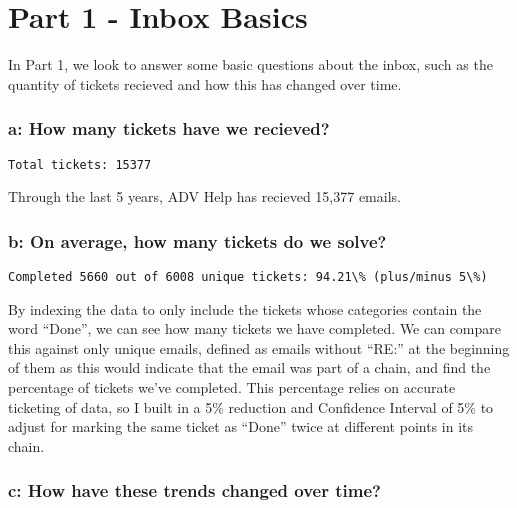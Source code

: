 \documentclass[11pt]{article}
\begin{document}
    \hypertarget{part-1---inbox-basics}{%
\section{Part 1 - Inbox Basics}\label{part-1---inbox-basics}}

In Part 1, we look to answer some basic questions about the inbox, such
as the quantity of tickets recieved and how this has changed over time.

\hypertarget{a-how-many-tickets-have-we-recieved}{%
\subsubsection{a: How many tickets have we
recieved?}\label{a-how-many-tickets-have-we-recieved}}


    \begin{Verbatim}[commandchars=\\\{\}]
Total tickets: 15377
    \end{Verbatim}

    Through the last 5 years, ADV Help has recieved 15,377 emails.

    \hypertarget{b-on-average-how-many-tickets-do-we-solve}{%
\subsubsection{b: On average, how many tickets do we
solve?}\label{b-on-average-how-many-tickets-do-we-solve}}

    \begin{Verbatim}[commandchars=\\\{\}]
Completed 5660 out of 6008 unique tickets: 94.21\% (plus/minus 5\%)
    \end{Verbatim}

    By indexing the data to only include the tickets whose categories
contain the word ``Done'', we can see how many tickets we have
completed. We can compare this against only unique emails, defined as
emails without ``RE:'' at the beginning of them as this would indicate
that the email was part of a chain, and find the percentage of tickets
we've completed. This percentage relies on accurate ticketing of data,
so I built in a 5\% reduction and Confidence Interval of 5\% to adjust
for marking the same ticket as ``Done'' twice at different points in its
chain.

    \hypertarget{c-how-have-these-trends-changed-over-time}{%
\subsubsection{c: How have these trends changed over
time?}\label{c-how-have-these-trends-changed-over-time}}
\end{document}
